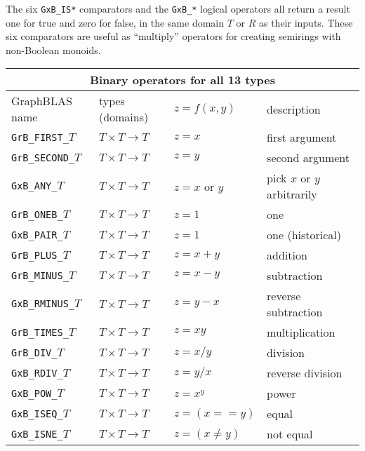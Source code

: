 \documentclass[12pt]{article}
\begin{document}
The six \verb'GxB_IS*' comparators and the \verb'GxB_*' logical
operators all return a result one for true and zero for false, in the same
domain $T$ or $R$ as their inputs.  These six comparators are useful
as ``multiply'' operators for creating semirings with non-Boolean monoids.

\vspace{0.2in}
{\footnotesize
\begin{tabular}{|llll|}
\hline
\multicolumn{4}{|c|}{Binary operators for all 13 types} \\
\hline
GraphBLAS name        & types (domains)            & $z=f(x,y)$      & description \\
\hline
\verb'GrB_FIRST_'$T$  & $T \times T \rightarrow T$ & $z = x$         & first argument \\
\verb'GrB_SECOND_'$T$ & $T \times T \rightarrow T$ & $z = y$         & second argument \\
\verb'GxB_ANY_'$T$    & $T \times T \rightarrow T$ & $z = x$ or $y$  & pick $x$ or $y$ arbitrarily \\
\verb'GrB_ONEB_'$T$   & $T \times T \rightarrow T$ & $z = 1$         & one \\
\verb'GxB_PAIR_'$T$   & $T \times T \rightarrow T$ & $z = 1$         & one (historical) \\
\verb'GrB_PLUS_'$T$   & $T \times T \rightarrow T$ & $z = x+y$       & addition \\
\verb'GrB_MINUS_'$T$  & $T \times T \rightarrow T$ & $z = x-y$       & subtraction \\
\verb'GxB_RMINUS_'$T$ & $T \times T \rightarrow T$ & $z = y-x$       & reverse subtraction \\
\verb'GrB_TIMES_'$T$  & $T \times T \rightarrow T$ & $z = xy$        & multiplication \\
\verb'GrB_DIV_'$T$    & $T \times T \rightarrow T$ & $z = x/y$       & division \\
\verb'GxB_RDIV_'$T$   & $T \times T \rightarrow T$ & $z = y/x$       & reverse division \\
\verb'GxB_POW_'$T$    & $T \times T \rightarrow T$ & $z = x^y$       & power \\
\hline
\verb'GxB_ISEQ_'$T$   & $T \times T \rightarrow T$ & $z = (x == y)$  & equal \\
\verb'GxB_ISNE_'$T$   & $T \times T \rightarrow T$ & $z = (x \ne y)$ & not equal \\
\hline
\end{tabular}
}
\vspace{0.2in}
\end{document}
